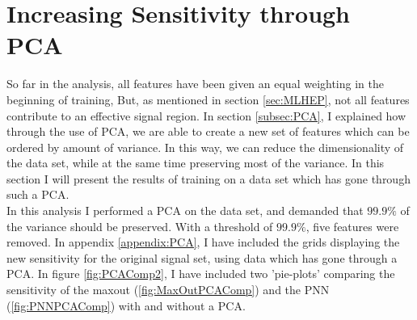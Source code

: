 \section{Increasing Sensitivity through PCA}\label{sec:PCA}
So far in the analysis, all features have been given an equal weighting in the beginning of training,
But, as mentioned in section \ref{sec:MLHEP}, not all features contribute to an effective signal 
region. In section \ref{subsec:PCA}, I explained how through the use of \ac{PCA}, we are able to 
create a new set of features which can be ordered by amount of variance. In this way, we can reduce
the dimensionality of the data set, while at the same time preserving most of the variance. In this 
section I will present the results of training on a data set which has gone through such a \ac{PCA}.
\\
In this analysis I performed a \ac{PCA} on the data set, and demanded that $99.9\%$ of the variance 
should be preserved. With a threshold of $99.9\%$, five features were removed. In appendix \ref{appendix:PCA}, I have included 
the grids displaying the new sensitivity for the original signal set, using data which has gone through a \ac{PCA}. 
In figure \ref{fig:PCAComp2}, I have included two 'pie-plots' comparing the sensitivity of the maxout (\ref{fig:MaxOutPCAComp})
and the \ac{PNN} (\ref{fig:PNNPCAComp}) with and without a \ac{PCA}.\\

